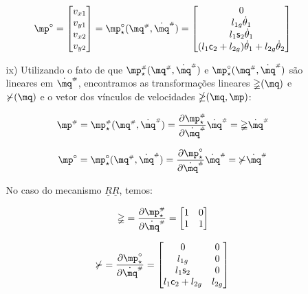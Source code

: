 \begin{itemize}
\begin{itemize}
	\begin{equation}
	\mp^\circ = 
	\begin{bmatrix}
	v_{x1} \\
	v_{y1} \\
	v_{x2} \\
	v_{y2} \\
	\end{bmatrix}
	= \mp^\circ_ \star (\mq\ssh, \dot{\mq}\ssh ) =
	\begin{bmatrix}
	0 \\
	l_{1g} \dot{\theta}_1 \\
	l_1 \ssin_2 \dot{\theta}_1\\
	(l_1 \ccos_2 + l_{2g} )\dot{\theta}_1 + l_{2g} \dot{\theta}_2 \\
	\end{bmatrix}
	\end{equation}
	
	\item[ix)] Utilizando o fato de que $\mp\ssh_\star (\mq\ssh, \dot{\mq}\ssh )$ e $\mp^\circ_ \star (\mq\ssh, \dot{\mq}\ssh )$ s\~ao lineares em $\dot{\mq}\ssh$, encontramos as transforma\c{c}\~oes lineares $\mathbb{\Psi}(\mq)$ e $\mathbb{\Upsilon}(\mq)$ e o vetor dos v\'inculos de velocidades $\mathbb{\Lambda}(\mq,\mp)$:
	
	\begin{equation}
	\mp\ssh = \mp\ssh_\star (\mq\ssh, \dot{\mq}\ssh ) = \frac{\partial \mp\ssh_\star}{\partial \dot{\mq}\ssh} \dot{\mq}\ssh = \mathbb{\Psi} \dot{\mq}\ssh
	\end{equation}
	
	\begin{equation}
	\mp^\circ = \mp^\circ_\star (\mq\ssh, \dot{\mq}\ssh ) = \frac{\partial \mp^\circ_\star}{\partial \dot{\mq}\ssh} \dot{\mq}\ssh = \mathbb{\Upsilon} \dot{\mq}\ssh
	\end{equation}

	No caso do mecanismo $\underline{R}\underline{R}$, temos:
	
	\begin{equation}
	\mathbb{\Psi} = \frac{\partial \mp\ssh_\star}{\partial \dot{\mq}\ssh} =
	\begin{bmatrix}
	1 & 0  \\
	1 & 1  \\
	\end{bmatrix}
	\end{equation}
	
	\begin{equation}
	\mathbb{\Upsilon} = \frac{\partial \mp^\circ_\star}{\partial \dot{\mq}\ssh} =
	\begin{bmatrix}
	0 & 0 \\
	l_{1g} & 0 \\
	l_1 \ssin_2 & 0 \\
	l_1 \ccos_2 + l_{2g} & l_{2g} 
	\end{bmatrix}
	\end{equation}\\


\end{itemize}
\end{itemize}
